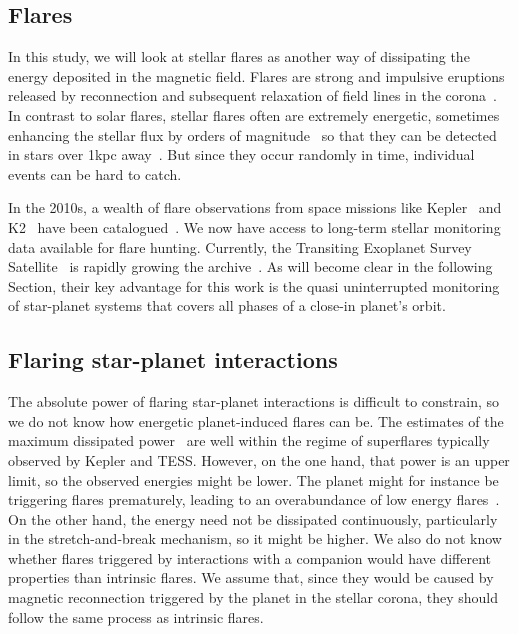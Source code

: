 \documentclass[twocolumn]{aastex631}
\begin{document}
\subsection{Flares}
\label{sec:intro:flares}
In this study, we will look at stellar flares as another way of dissipating the energy deposited in the magnetic field. Flares are strong and impulsive eruptions released by reconnection and subsequent relaxation of field lines in the corona~\citep{svestka1976solar,priest2002magnetic}. In contrast to solar flares, stellar flares often are extremely energetic, sometimes enhancing the stellar flux by orders of magnitude~\citep{maehara2012superflares, shibayama2013superflares, paudel2018k2} so that they can be detected in stars over 1kpc away~\citep{chang2015}. But since they occur randomly in time, individual events can be hard to catch. %

In the 2010s, a wealth of flare observations from space missions like Kepler~\citep{borucki2010kepler} and K2~\citep{howell2014k2} have been catalogued~\citep{davenport2016kepler, paudel2018k2, ilin2021flares}. We now have access to long-term stellar monitoring data available for flare hunting. Currently, the Transiting Exoplanet Survey Satellite~\citep{ricker2015transiting} is rapidly growing the archive~\citep{gunther2020stellar}. As will become clear in the following Section, their key advantage for this work is the quasi uninterrupted monitoring of star-planet systems that covers all phases of a close-in planet's orbit.

\subsection{Flaring star-planet interactions}
\label{sec:intro:fspi}
The absolute power of flaring star-planet interactions is difficult to constrain, so we do not know how energetic planet-induced flares can be. The estimates of the maximum dissipated power~\citep{lanza2018closeby} are well within the regime of superflares typically observed by Kepler and TESS. However, on the one hand, that power is an upper limit, so the observed energies might be lower. The planet might for instance be triggering flares prematurely, leading to an overabundance of low energy flares~\citep{loyd2023flares}. On the other hand, the energy need not be dissipated continuously, particularly in the stretch-and-break mechanism, so it might be higher. We also do not know whether flares triggered by interactions with a companion would have different properties than intrinsic flares. We assume that, since they would be caused by magnetic reconnection triggered by the planet in the stellar corona, they should follow the same process as intrinsic flares. 
\end{document}
